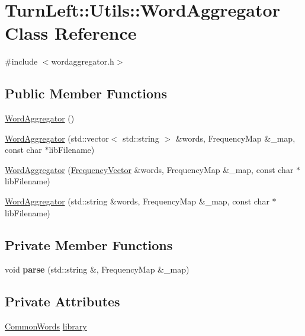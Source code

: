 \hypertarget{classTurnLeft_1_1Utils_1_1WordAggregator}{
\section{TurnLeft::Utils::WordAggregator Class Reference}
\label{classTurnLeft_1_1Utils_1_1WordAggregator}
}


{\ttfamily \#include $<$wordaggregator.h$>$}

\subsection*{Public Member Functions}
\begin{DoxyCompactItemize}
\item 
\hyperlink{classTurnLeft_1_1Utils_1_1WordAggregator_a721da98f0dec33c9abadd19c04669165}{WordAggregator} ()
\item 
\hyperlink{classTurnLeft_1_1Utils_1_1WordAggregator_a10b5f069149857994a6db20e21e9ca11}{WordAggregator} (std::vector$<$ std::string $>$ \&words, FrequencyMap \&\_\-map, const char $\ast$libFilename)
\item 
\hyperlink{classTurnLeft_1_1Utils_1_1WordAggregator_af61d528ba324a2436f0cf0cdabe29448}{WordAggregator} (\hyperlink{classTurnLeft_1_1Utils_1_1HungryVector}{FrequencyVector} \&words, FrequencyMap \&\_\-map, const char $\ast$libFilename)
\item 
\hyperlink{classTurnLeft_1_1Utils_1_1WordAggregator_a9e1a0859a5a78786c59ccaebd30440e7}{WordAggregator} (std::string \&words, FrequencyMap \&\_\-map, const char $\ast$libFilename)
\end{DoxyCompactItemize}
\subsection*{Private Member Functions}
\begin{DoxyCompactItemize}
\item 
\hypertarget{classTurnLeft_1_1Utils_1_1WordAggregator_aad3c3827967a9b9e742dce95e28c96aa}{
void {\bfseries parse} (std::string \&, FrequencyMap \&\_\-map)}
\label{classTurnLeft_1_1Utils_1_1WordAggregator_aad3c3827967a9b9e742dce95e28c96aa}

\end{DoxyCompactItemize}
\subsection*{Private Attributes}
\begin{DoxyCompactItemize}
\item 
\hyperlink{classTurnLeft_1_1Utils_1_1CommonWords}{CommonWords} \hyperlink{classTurnLeft_1_1Utils_1_1WordAggregator_a51f9ddd22dab31dc20cb6c80cdd5711f}{library}
\end{DoxyCompactItemize}


